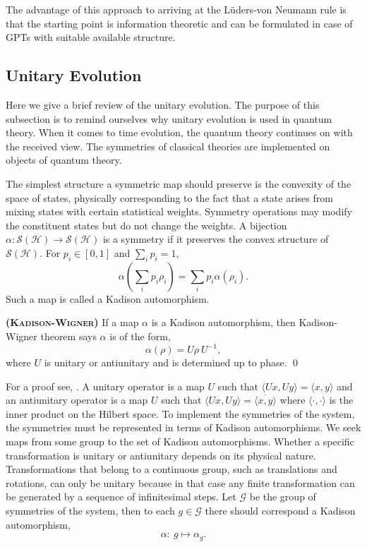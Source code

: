 \documentclass[11pt]{report}
\begin{document}
The advantage of this approach to arriving at the L\"uders-von Neumann rule is that the starting point is information theoretic and can be formulated in case of GPTs with suitable available structure.

\subsection{Unitary Evolution}
Here we give a brief review of the unitary evolution. The purpose of this subsection is to remind ourselves why unitary evolution is used in quantum theory. When it comes to time evolution, the quantum theory continues on with the received view. The symmetries of classical theories are implemented on objects of quantum theory. 

The simplest structure a symmetric map should preserve is the convexity of the space of states, physically corresponding to the fact that a state arises from mixing states with certain statistical weights. Symmetry operations may modify the constituent states but do not change the weights. A bijection $\alpha:\mathcal{S}(\mathcal{H})\to \mathcal{S}(\mathcal{H})$ is a symmetry if it preserves the convex structure of $\mathcal{S}(\mathcal{H})$. For $p_i\in[0,1]$ and $\sum_i p_i=1$,
$$\alpha(\textstyle\sum_i p_i \rho_i)=\textstyle\sum_i p_i \alpha(\rho_i).$$
Such a map is called a Kadison automorphism. 

\vspace{1em}
\begin{theorem}
	{\bfseries\textsc{(Kadison-Wigner)}} If a map $\alpha$ is a Kadison automorphism, then Kadison-Wigner theorem says $\alpha$ is of the form,
	$$\alpha(\rho)=U\rho \:U^{-1},$$
	where $U$ is unitary or antiunitary and is determined up to phase. \qed
\end{theorem}
\vspace{1em}

For a proof see, \cite{Landsman}. A unitary operator is a map $U$ such that $\langle Ux, Uy \rangle = \langle x, y \rangle$ and an antiunitary operator is a map $U$ such that $\langle Ux, Uy \rangle = \overline{\langle x, y \rangle}$ where $\langle\cdot,\cdot\rangle$ is the inner product on the Hilbert space. To implement the symmetries of the system, the symmetries must be represented in terms of Kadison automorphisms. We seek maps from some group to the set of Kadison automorphisms. Whether a specific transformation is unitary or antiunitary depends on its physical nature. Transformations that belong to a continuous group, such as translations and rotations, can only be unitary because in that case any finite transformation can be generated by a sequence of infinitesimal steps. Let $\mathcal{G}$ be the group of symmetries of the system, then to each $g\in\mathcal{G}$ there should correspond a Kadison automorphism,
$$\alpha:\:g\mapsto \alpha_g.$$
\end{document}
